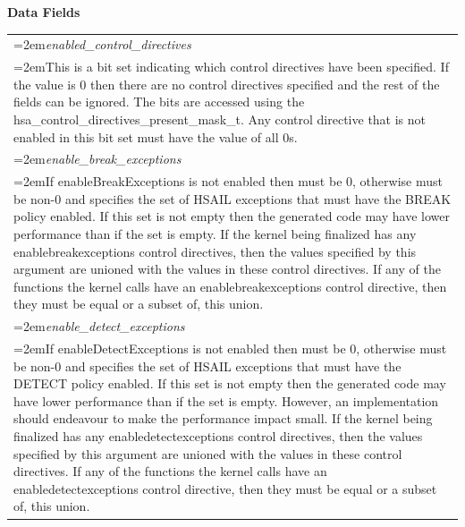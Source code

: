 \documentclass[final]{book}
\newcommand{\reffld}[1]{\textit{#1}}
\begin{document}
\begin{appendices}
\noindent\textbf{Data Fields}\\[-6mm]
\begin{longtable}{@{}>{\hangindent=2em}p{\textwidth}}
\reffld{enabled_control_directives}\\\hspace{2em}This is a bit set indicating which control directives have been specified. If the value is 0 then there are no control directives specified and the rest of the fields can be ignored. The bits are accessed using the hsa_control_directives_present_mask_t. Any control directive that is not enabled in this bit set must have the value of all 0s.\\[2mm]
\reffld{enable_break_exceptions}\\\hspace{2em}If enableBreakExceptions is not enabled then must be 0, otherwise must be non-0 and specifies the set of HSAIL exceptions that must have the BREAK policy enabled. If this set is not empty then the generated code may have lower performance than if the set is empty. If the kernel being finalized has any enablebreakexceptions control directives, then the values specified by this argument are unioned with the values in these control directives. If any of the functions the kernel calls have an enablebreakexceptions control directive, then they must be equal or a subset of, this union.\\[2mm]
\reffld{enable_detect_exceptions}\\\hspace{2em}If enableDetectExceptions is not enabled then must be 0, otherwise must be non-0 and specifies the set of HSAIL exceptions that must have the DETECT policy enabled. If this set is not empty then the generated code may have lower performance than if the set is empty. However, an implementation should endeavour to make the performance impact small. If the kernel being finalized has any enabledetectexceptions control directives, then the values specified by this argument are unioned with the values in these control directives. If any of the functions the kernel calls have an enabledetectexceptions control directive, then they must be equal or a subset of, this union.\\[2mm]

\end{longtable}
\end{appendices}
\end{document}
